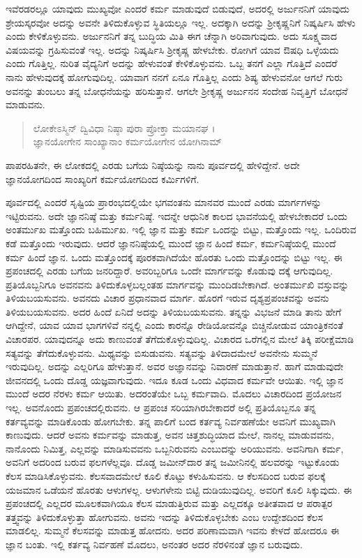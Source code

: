 ಇವೆರಡರಲ್ಲೂ ಯಾವುದು ಮುಖ್ಯವೋ ಎಂದರೆ ಕರ್ಮ ಮಾಡುವುದೆ ಬಿಡುವುದೆ, ಅದರಲ್ಲಿ ಅರ್ಜುನನಿಗೆ ಯಾವುದು ಶ್ರೇಯಸ್ಕರವೋ ಅದನ್ನು ಅವನೇ ತಿಳಿದುಕೊಳ್ಳುವ ಸ್ಥಿತಿಯಲ್ಲೂ ಇಲ್ಲ. ಅದಕ್ಕಾಗಿ ಅದನ್ನು ಶ್ರೀಕೃಷ್ಣನಿಗೆ ನಿಷ್ಕರ್ಷಿಸಿ ಹೇಳು ಎಂದು ಕೇಳಿಕೊಳ್ಳುವನು. ಅರ್ಜುನನಿಗೆ ತನ್ನ ಬುದ್ಧಿಯ ಮಿತಿ ಈಗ ಚೆನ್ನಾಗಿ ಅರಿವಾಗುವುದು. ಅದು ಸೂಕ್ಷ್ಮವಾದ ವಿಷಯವನ್ನು ಗ್ರಹಿಸುವಂತೆ ಇಲ್ಲ. ಅದನ್ನು ನಿಷ್ಕರ್ಷಿಸಿ ಶ್ರೀಕೃಷ್ಣ ಹೇಳಬೇಕು. ರೋಗಿಗೆ ಯಾವ ಔಷಧಿ ಒಳ್ಳೆಯದು ಎಂದು ಗೊತ್ತಿಲ್ಲ. ನುರಿತ ವೈದ್ಯನಿಗೆ ಅದನ್ನು ಹೇಳುವಂತೆ ಕೇಳಿಕೊಳ್ಳುವನು. ಒಬ್ಬ ತನಗೆ ಎಲ್ಲಾ ಗೊತ್ತಿದೆ ಎಂದರೆ ನಾನು ಹೇಳುವುದಕ್ಕೆ ಹೋಗುವುದಿಲ್ಲ. ಯಾವಾಗ ನನಗೆ ಏನೂ ಗೊತ್ತಿಲ್ಲ ಎಂದು ಶಿಷ್ಯ ಹೇಳುವನೋ ಆಗಲೆ ಗುರು ಅವನನ್ನು ತುಂಬಲು ತನ್ನ ಬೋಧನೆಯನ್ನು ಹರಿಸುತ್ತಾನೆ. ಆಗಲೇ ಶ್ರೀಕೃಷ್ಣ ಅರ್ಜುನನ ಸಂದೇಹ ನಿವೃತ್ತಿಗೆ ಬೋಧನೆ ಮಾಡುವನು.

\begin{verse}
ಲೋಕೇಽಸ್ಮಿನ್ ದ್ವಿವಿಧಾ ನಿಷ್ಠಾ ಪುರಾ ಪ್ರೋಕ್ತಾ ಮಯಾನಘ ।\\ಜ್ಞಾನಯೋಗೇನ ಸಾಂಖ್ಯಾನಾಂ ಕರ್ಮಯೋಗೇನ ಯೋಗಿನಾಮ್ 
\end{verse}

{\small ಪಾಪರಹಿತನೇ, ಈ ಲೋಕದಲ್ಲಿ ಎರಡು ಬಗೆಯ ನಿಷ್ಠೆಯನ್ನು ನಾನು ಪೂರ್ವದಲ್ಲಿ ಹೇಳಿದ್ದೇನೆ. ಅದೇ ಜ್ಞಾನಯೋಗದಿಂದ ಸಾಂಖ್ಯರಿಗೆ ಕರ್ಮಯೋಗದಿಂದ ಕರ್ಮಿಗಳಿಗೆ.}

ಪೂರ್ವದಲ್ಲಿ ಎಂದರೆ ಸೃಷ್ಟಿಯ ಪ್ರಾರಂಭದಲ್ಲಿಯೇ ಭಗವಂತನು ಮಾನವರ ಮುಂದೆ ಎರಡು ಮಾರ್ಗಗಳನ್ನು ಇಟ್ಟಿರುವನು. ಅದೇ ಜ್ಞಾನನಿಷ್ಠೆ ಮತ್ತು ಕರ್ಮನಿಷ್ಠೆ. ಇದನ್ನೇ ಆಧುನಿಕ ಕಾಲದ ಭಾವನೆಯಲ್ಲಿ ಹೇಳಬೇಕಾದರೆ ಒಂದು ಅಂತರ್ಮುಖ ಮತ್ತೊಂದು ಬಹಿರ್ಮುಖ. ಇಲ್ಲಿ ಜ್ಞಾನ ಮತ್ತು ಕರ್ಮ ಒಂದನ್ನು ಬಿಟ್ಟು, ಮತ್ತೊಂದು ಇಲ್ಲ. ಒಂದಿರುವ ಕಡೆ ಮತ್ತೊಂದು ಇರುವುದು. ಆದರೆ ಜ್ಞಾನನಿಷ್ಠೆಯಲ್ಲಿ ಮುಂದೆ ಜ್ಞಾನ ಹಿಂದೆ ಕರ್ಮ, ಕರ್ಮನಿಷ್ಠೆಯಲ್ಲಿ ಮುಂದೆ ಕರ್ಮ ಹಿಂದೆ ಜ್ಞಾನ. ಒಂದು ಮತ್ತೊಂದಕ್ಕೆ ಪೂರಕವಾಗಿದೆಯೇ ಹೊರತು ಒಂದು ಮತ್ತೊಂದನ್ನು ಬಿಟ್ಟು ಇಲ್ಲ. ಈ ಪ್ರಪಂಚದಲ್ಲಿ ಎರಡು ಬಗೆಯ ಜನರಿದ್ದಾರೆ. ಅವರಿಬ್ಬರಿಗೂ ಒಂದೇ ಮಾರ್ಗವನ್ನು ಕೊಡುವು ದಕ್ಕೆ ಆಗುವುದಿಲ್ಲ. ಪ್ರತಿಯೊಬ್ಬನಿಗೂ ಅವನವನು ತಿಳಿದುಕೊಳ್ಳಬಲ್ಲಂತಹ ಮಾರ್ಗವನ್ನು ಮುಂದಿಡಬೇಕಾಗಿದೆ. ಅಂತರ್ಮುಖಿ ವಸ್ತುವನ್ನು ತಿಳಿಯಬಯಸುವನು. ಅವನದು ವಿಚಾರ ಪ್ರಧಾನವಾದ ಮಾರ್ಗ. ಹೊರಗೆ ಇರುವ ದೃಶ್ಯಪ್ರಪಂಚವನ್ನು ಅವನು ತಿಳಿಯಬಯಸುವನು. ಅದರ ಹಿಂದೆ ಏನಿದೆ ಅದನ್ನು ತಿಳಿಯಬಯಸುವನು. ತನ್ನನ್ನು ವಿಭಜನೆ ಮಾಡಿ ತಾನು ಹೇಗೆ ಆಗಿದ್ದೇನೆ, ಯಾವ ಯಾವ ಭಾಗಗಳಿವೆ ನನ್ನಲ್ಲಿ ಎಂದು ಕಾರನ್ನೊ ರೇಡಿಯೋವನ್ನೊ ಬಿಚ್ಚಿನೋಡುವ ಯಾಂತ್ರಿಕನಂತೆ ವಿಚಾರಪರ. ಯಾವುದನ್ನೂ ಅದು ಕಾಣುವಂತೆ ತೆಗೆದುಕೊಳ್ಳುವುದಿಲ್ಲ. ವಿಚಾರದ ಒರೆಗಲ್ಲಿನ ಮೇಲೆ ತಿಕ್ಕಿ ಪರೀಕ್ಷೆಮಾಡಿ ಸತ್ಯವನ್ನು ತೆಗೆದುಕೊಳ್ಳುವನು. ಮಿಥ್ಯವನ್ನು ಬಿಸುಡುವನು. ಸತ್ಯವನ್ನು ತಿಳಿದಾದಮೇಲೆ ಅವನೇನು ಸುಮ್ಮನೆ ಇರುವುದಿಲ್ಲ. ಅದನ್ನು ಎಲ್ಲರಿಗೂ ಹೇಳುತ್ತಾನೆ. ಅವರ ಅಜ್ಞಾನವನ್ನು ನಿವಾರಣೆ ಮಾಡುತ್ತಾನೆ. ಹಾಗೆ ಮಾಡುವುದೇ ಜೀವನದಲ್ಲಿ ಒಂದು ದೊಡ್ಡ ಯಜ್ಞವಾಗುವುದು. ಇದೂ ಕೂಡ ಒಂದು ವಿಧವಾದ ಕರ್ಮವೇ ಆಯಿತು. ಇಲ್ಲಿ ಜ್ಞಾನ ಮುಂದೆ ಅದರ ನೆರಳು ಕರ್ಮ ಆಯಿತು. ಅದರಂತೆಯೇ ಒಬ್ಬ ಕರ್ಮವಾದಿ. ಮೊದಲು ವಿಚಾರದಿಂದ ಪ್ರಯೋಜನ ಇಲ್ಲ. ಅವನೊಂದು ಪ್ರಪಂಚದಲ್ಲಿರುವನು. ಆ ಪ್ರಪಂಚ ಸರಿಯಾಗಿರಬೇಕಾದರೆ ಅಲ್ಲಿ ಪ್ರತಿಯೊಬ್ಬನೂ ತನ್ನ ಕರ್ತವ್ಯವನ್ನು ಮಾಡಿಕೊಂಡು ಹೋಗಬೇಕು. ತನ್ನ ಪಾಲಿಗೆ ಬಂದ ಕರ್ತವ್ಯ ನಿರ್ವಹಣೆಯೇ ಅವನಿಗೆ ಮುಖ್ಯವಾಗಿ ಕಾಣುವುದು. ಆದರೆ ಅವನು ಕರ್ಮವನ್ನು ಮಾಡುತ್ತ, ಅವನ ಚಿತ್ತಶುದ್ಧಿಯಾದ ಮೇಲೆ, ನಾನಲ್ಲ ಮಾಡುವವನು, ನಾನೊಂದು ನಿಮಿತ್ತ, ಎಲ್ಲವನ್ನು ಮಾಡಿಸುವವನು ಒಬ್ಬನಿರುವನು ಎಂಬುದನ್ನು ಅರಿಯುವನು. ಅವನಿಗಾಗಿ ಕರ್ಮ, ಅವನಿಗೆ ಅದರಿಂದ ಬರುವ ಫಲಗಳೆಲ್ಲವೂ. ದೊಡ್ಡ ಜಮೀನ್​ದಾರ ತನ್ನ ಜಮೀನಿನಲ್ಲಿ ಹಲವರನ್ನು ಇಟ್ಟುಕೊಂಡು ಕೆಲಸ ಮಾಡಿಸಿಕೊಳ್ಳುವನು. ಕೆಲಸವಾದಮೇಲೆ ಕೂಲಿ ಕೊಟ್ಟು ಕಳುಹಿಸುವನು. ಆ ಕೆಲಸದಿಂದ ಬರುವ ಫಲಕ್ಕೆ ಯಜಮಾನ ಒಡೆಯನೆ ಹೊರತು ಆಳುಗಳಲ್ಲ. ಆಳುಗಳೇನು ಬಿಟ್ಟಿ ದುಡಿಯುವುದಿಲ್ಲ. ಅವರಿಗೆ ಕೂಲಿ ಸಿಕ್ಕುವುದು. ಈ ಪ್ರಪಂಚದಲ್ಲಿ ಎಲ್ಲದರ ಮೂಲಕವಾಗಿಯೂ ಕೆಲಸ ಮಾಡುತ್ತಿರುವ ಮತ್ತು ಎಲ್ಲದಕ್ಕೂ ಅತೀತವಾದ ಆ ಪರಾತ್ಪರ ತತ್ತ್ವವನ್ನು ತಿಳಿದುಕೊಳ್ಳುತ್ತಾ ಹೋಗುವನು. ಅವನು ಇದನ್ನು ತಿಳಿದುಕೊಳ್ಳಬೇಕು ಎಂಬ ಉದ್ದೇಶದಿಂದ ಕೆಲಸ ಮಾಡಲಿಲ್ಲ. ಸುಮ್ಮನೆ ಕೆಲಸವನ್ನು ಮಾಡುತ್ತ ಹೋದನು. ಅದರ ಪರಿಣಾಮವಾಗಿ ಇವನು ಕೇಳದೆ ಹೋದರೂ ಈ ಜ್ಞಾನ ಬಂತು. ಇಲ್ಲಿ ಕರ್ತವ್ಯ ನಿರ್ವಹಣೆ ಮೊದಲು, ಅನಂತರ ಅದರ ನೆರಳಿನಂತೆ ಜ್ಞಾನ ಬರುವುದು.

